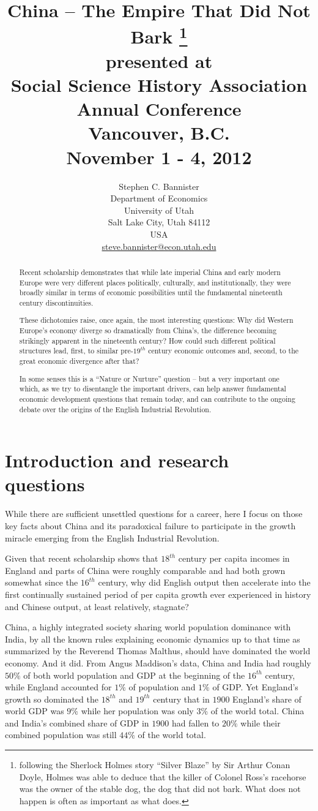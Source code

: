 \documentclass[12pt]{article}
\title{China -- The Empire That Did Not Bark \footnote{following the Sherlock Holmes story ``Silver Blaze'' by Sir Arthur Conan Doyle, Holmes was able to deduce that the killer of Colonel Ross's racehorse was the owner of the stable dog, the dog that did not bark. What does not happen is often as important as what does.}\\
presented at\\
Social Science History Association\\
Annual Conference\\
Vancouver, B.C.\\
November 1 - 4, 2012}
\author{Stephen C. Bannister\\
	Department of Economics\\
	University of Utah\\
	Salt Lake City, Utah 84112\\
	USA\\
	\href{mailto:steve.bannister@econ.utah.edu}{steve.bannister@econ.utah.edu}\\
	}
\date{}
\numberwithin{equation}{section}
\begin{document}
\graphicspath{{./images/}}

%
	\maketitle
	
	\begin{abstract}
	Recent scholarship demonstrates that while late imperial China and early modern Europe were very different places politically, culturally, and institutionally, they were broadly similar in terms of economic possibilities until the fundamental nineteenth century discontinuities.
	
	These dichotomies raise, once again, the most interesting questions: Why did Western Europe's economy diverge so dramatically from China's, the difference becoming strikingly apparent in the nineteenth century? How could such different political structures lead, first, to similar pre-$19^{th}$ century economic outcomes and, second, to the great economic divergence after that?
	
	In some senses this is a ``Nature or Nurture'' question -- but a very important one which, as we try to disentangle the important drivers, can help answer fundamental economic development questions that remain today, and can contribute to the ongoing debate over the origins of the English Industrial Revolution. 
	\end{abstract}
	\section{Introduction and research questions}
	While there are sufficient unsettled questions for a career, here I focus on those key facts about China and its paradoxical failure to participate in the growth miracle emerging from the English Industrial Revolution.
	
	Given that recent scholarship shows that $18^{th}$ century per capita incomes in England and parts of China were roughly comparable and had both grown somewhat since the $16^{th}$ century, why did English output then accelerate into the first continually sustained period of per capita growth ever experienced in history and Chinese output, at least relatively, stagnate? 
	
	China, a highly integrated society sharing world population dominance with India, by all the known rules explaining economic dynamics up to that time as summarized by the Reverend Thomas Malthus, should have dominated the world economy. And it did. From Angus Maddison's data, China and India had roughly $50\%$ of both world population and GDP at the beginning of the $16^{th}$ century, while England accounted for $1\%$ of population and $1\%$ of GDP. Yet England's growth so dominated the $18^{th}$ and $19^{th}$ century that in $1900$ England's share of world GDP was $9\%$ while her population was only $3\%$ of the world total. China and India's combined share of GDP in $1900$ had fallen to $20\%$ while their combined population was still $44\%$ of the world total.
	
\end{document}
